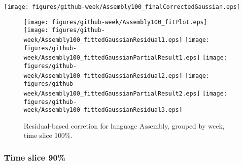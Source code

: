 \begin{center}
{\texttt{[image: figures/github-week/Assembly100\_finalCorrectedGaussian.eps]}}
\end{center}

\FloatBarrier

\begin{figure}[t]
\centering
{}
{\texttt{[image: figures/github-week/Assembly100\_fitPlot.eps]}}
{\texttt{[image: figures/github-week/Assembly100\_fittedGaussianResidual1.eps]}}
{\texttt{[image: figures/github-week/Assembly100\_fittedGaussianPartialResult1.eps]}}
{\texttt{[image: figures/github-week/Assembly100\_fittedGaussianResidual2.eps]}}
{\texttt{[image: figures/github-week/Assembly100\_fittedGaussianPartialResult2.eps]}}
{\texttt{[image: figures/github-week/Assembly100\_fittedGaussianResidual3.eps]}}
\caption{Residual-based corretion for language Assembly, grouped by week, time slice 100\%.}
\end{figure}


\FloatBarrier


\subsubsection{Time slice 90\%}

